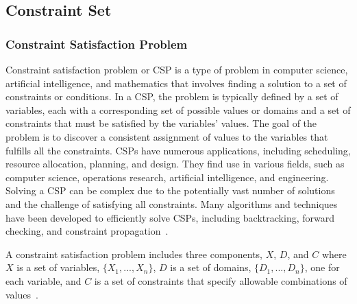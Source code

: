     \subsection{Constraint Set}
    
    \subsubsection{Constraint Satisfaction Problem}
    Constraint satisfaction problem or CSP is a type of problem in computer science, artificial intelligence, and mathematics that involves finding a solution to a set of constraints or conditions. In a CSP, the problem is typically defined by a set of variables, each with a corresponding set of possible values or domains and a set of constraints that must be satisfied by the variables' values. The goal of the problem is to discover a consistent assignment of values to the variables that fulfills all the constraints.
    CSPs have numerous applications, including scheduling, resource allocation, planning, and design. They find use in various fields, such as computer science, operations research, artificial intelligence, and engineering. Solving a CSP can be complex due to the potentially vast number of solutions and the challenge of satisfying all constraints. Many algorithms and techniques have been developed to efficiently solve CSPs, including backtracking, forward checking, and constraint propagation~\cite{poole2010artificial, russell2010artificial}.
    
    A constraint satisfaction problem includes three components, $X$, $D$, and $C$ where 
    $X$ is a set of variables, $\{X_1,...,X_n\}$,
    $D$ is a set of domains, $\{D_1,...,D_n\}$, one for each variable, and 
    $C$ is a set of constraints that specify allowable combinations of values~\cite{russell2010artificial}.
    
    
